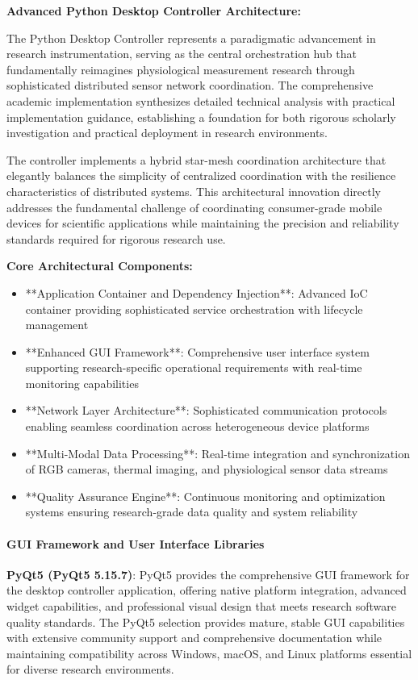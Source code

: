 \documentclass[12pt,a4paper]{article}
\begin{document}
\textbf{Advanced Python Desktop Controller Architecture:}

The Python Desktop Controller represents a paradigmatic advancement in research instrumentation, serving as the central
orchestration hub that fundamentally reimagines physiological measurement research through sophisticated distributed
sensor network coordination. The comprehensive academic implementation synthesizes detailed technical analysis with
practical implementation guidance, establishing a foundation for both rigorous scholarly investigation and practical
deployment in research environments.

The controller implements a hybrid star-mesh coordination architecture that elegantly balances the simplicity of
centralized coordination with the resilience characteristics of distributed systems. This architectural innovation
directly addresses the fundamental challenge of coordinating consumer-grade mobile devices for scientific applications
while maintaining the precision and reliability standards required for rigorous research use.

\textbf{Core Architectural Components:}

\begin{itemize}
\item **Application Container and Dependency Injection**: Advanced IoC container providing sophisticated service
  orchestration with lifecycle management
\item **Enhanced GUI Framework**: Comprehensive user interface system supporting research-specific operational requirements
  with real-time monitoring capabilities
\item **Network Layer Architecture**: Sophisticated communication protocols enabling seamless coordination across
  heterogeneous device platforms
\item **Multi-Modal Data Processing**: Real-time integration and synchronization of RGB cameras, thermal imaging, and
  physiological sensor data streams
\item **Quality Assurance Engine**: Continuous monitoring and optimization systems ensuring research-grade data quality and
  system reliability

\end{itemize}
\paragraph{GUI Framework and User Interface Libraries}

\textbf{PyQt5 (PyQt5 5.15.7)}: PyQt5 provides the comprehensive GUI framework for the desktop controller application,
offering native platform integration, advanced widget capabilities, and professional visual design that meets research
software quality standards. The PyQt5 selection provides mature, stable GUI capabilities with extensive community
support and comprehensive documentation while maintaining compatibility across Windows, macOS, and Linux platforms
essential for diverse research environments.
\end{document}
